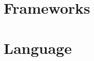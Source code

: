 \documentclass[a4paper,10pt,twoside]{book}
\begin{document}
\part{Frameworks}






\newcommand{\fig}[4]{
		\begin{figure}[#1]
			\centering
			\texttt{[image: \#3]}
			\caption{\label{fig:#3}#4}
		\end{figure}}

	\newcommand{\largefig}[4]{
		\begin{figure*}[#1]
			\centering
			\texttt{[image: \#3]}
			\caption{\label{fig:#3}#4}
		\end{figure*}}
		
	\newcommand{\asdf}[4]{
		\begin{subfigure}[\label{fig:#3}]
                \centering
                \texttt{[image: \#3]}
                \caption{\label{fig:#3}#4}                
        \end{subfigure}}








\part{Language}





\end{document}
